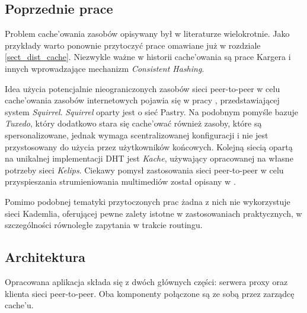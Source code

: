 \documentclass[a4paper,11pt]{scrartcl}
\newcommand{\s}{ }
\newcommand{\keszu}{cache'u}
\newcommand{\keszowac}{cache'ować}
\newcommand{\keszowania}{cache'owania}
\begin{document}
\subsection{Poprzednie prace}
Problem \keszowania\s zasobów opisywany był w literaturze wielokrotnie. Jako przykłady warto ponownie przytoczyć prace \cite{malpani1995making, chankhunthod1995hierarchical, povey1997distributed} omawiane już w rozdziale \ref{sect_dist_cache}. Niezwykle ważne w historii \keszowania\s są prace Kargera i innych \cite{karger1997consistent, karger1999web} wprowadzające mechanizm \textit{Consistent Hashing}.

Idea użycia potencjalnie nieograniczonych zasobów sieci peer-to-peer w celu \keszowania\s zasobów internetowych pojawia się w pracy \cite{iyer2002squirrel, clevenot2004simple}, przedstawiającej system \textit{Squirrel}. \textit{Squirrel} oparty jest o sieć Pastry\cite{rowstron2001pastry}. 
Na podobnym pomyśle bazuje \textit{Tuxedo}\cite{shi2003tuxedo}, który dodatkowo stara się \keszowac\s również zasoby, które są spersonalizowane, jednak wymaga scentralizowanej konfiguracji i nie jest przystosowany do użycia przez użytkowników końcowych. 
Kolejną siecią opartą na unikalnej implementacji DHT jest \textit{Kache}\cite{linga2004kache}, używający opracowanej na własne potrzeby sieci \textit{Kelips}.
Ciekawy pomysł zastosowania sieci peer-to-peer w celu przyspieszania strumieniowania multimediów został opisany w \cite{guo2006design}.

Pomimo podobnej tematyki przytoczonych prac żadna z nich nie wykorzystuje sieci Kademlia, oferującej pewne zalety istotne w zastosowaniach praktycznych, w szczególności równoległe zapytania w trakcie routingu.

\subsection{Architektura}
\label{sect_architecture}
Opracowana aplikacja składa się z dwóch głównych części: serwera proxy oraz klienta sieci peer-to-peer. Oba komponenty połączone są ze sobą przez zarządcę \keszu.
\end{document}
